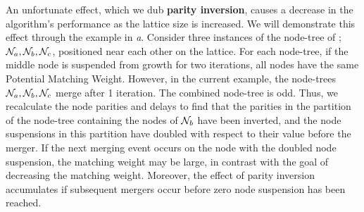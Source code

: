 An unfortunate effect, which we dub \textbf{parity inversion}, causes a decrease in the algorithm's performance as the lattice size is increased. We will demonstrate this effect through the example in \emph{a}. Consider three instances of the node-tree of ; $\mathcal{N}_a, \mathcal{N}_b, \mathcal{N}_c$, positioned near each other on the lattice. For each node-tree, if the middle node is suspended from growth for two iterations, all nodes have the same Potential Matching Weight. However, in the current example, the node-trees $\mathcal{N}_a, \mathcal{N}_b, \mathcal{N}_c$ merge after 1 iteration. The combined node-tree is odd. Thus, we recalculate the node parities and delays to find that the parities in the partition of the node-tree containing the nodes of $\mathcal{N}_b$ have been inverted, and the node suspensions in this partition have doubled with respect to their value before the merger. If the next merging event occurs on the node with the doubled node suspension, the matching weight may be large, in contrast with the goal of decreasing the matching weight. Moreover, the effect of parity inversion accumulates if subsequent mergers occur before zero node suspension has been reached. %

